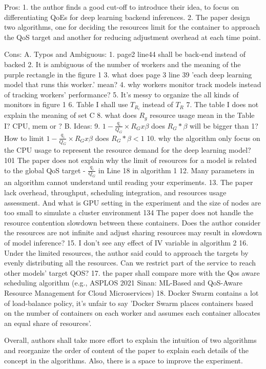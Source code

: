\documentclass[UTF8]{article}
\begin{document}
Pros: 1. the author finds a good cut-off to introduce their idea, to focus on differentiating QoEs for deep learning backend inferences. 2. The paper design two algorithms, one for deciding the resources limit for the container to approach the QoS target and another for reducing adjustment overhead at each time point.

Cons: A. Typos and Ambiguous: 1. page2 line44 shall be back-end instead of backed 2. It is ambiguous of the number of workers and the meaning of the purple rectangle in the figure 1 3. what does page 3 line 39 'each deep learning model that runs this worker.' mean? 4. why workers monitor track models instead of tracking workers' performance? 5. It's messy to organize the all kinds of monitors in figure 1 6. Table I shall use $T_{R_i}$ instead of $T_R$ 7. The table I does not explain the meaning of set C 8. what does $R_g$ resource usage mean in the Table I? CPU, mem or ? B. Ideas: 9.  $1− \frac{q_i}{Q_G}×R_Gx\beta$ does $R_G*\beta$ will be bigger than 1? How to limit $1− \frac{q_i}{Q_G}×R_Gx\beta$ does $R_G*\beta < 1$  10. why the algorithm only focus on the CPU usage to represent the resource demand for the deep learning model? 101 The paper does not explain why the limit of resources for a model is related to the global QoS target - $\frac{q_i}{Q_G}$ in Line 18 in algorithm 1 12. Many parameters in an algorithm cannot understand until reading your experiments. 13. The paper lack overhead, throughput, scheduling integration, and resources usage assessment. And what is GPU setting in the experiment and the size of nodes are too small to simulate a cluster environment 134 The paper does not handle the resource contention slowdown between these containers. Does the author consider the resources are not infinite and adjust sharing resources may result in slowdown of model inference? 15. I don't see any effect of IV variable in algorithm 2 16. Under the limited resources, the author said could to approach the targets by evenly distributing all the resources. Can we restrict part of the service to reach other models' target QOS?  17. the paper shall compare more with the Qos aware scheduling algorithm (e.g., ASPLOS 2021 Sinan: ML-Based and QoS-Aware Resource Management for Cloud Microservices) 18. Docker Swarm contains a lot of load-balance policy,  it's unfair to say 'Docker Swarm places containers based on the number of containers on each worker and assumes each container allocates an equal share of resources'.  

Overall, authors shall take more effort to explain the intuition of two algorithms and reorganize the order of content of the paper to explain each details of the concept in the algorithms. Also, there is a space to improve the experiment.
\end{document}
